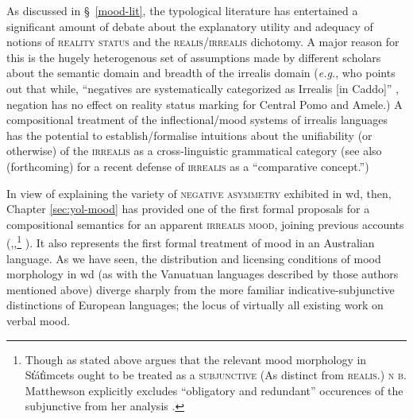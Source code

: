 %
%
%




As discussed in \S~\ref{mood-lit}, the typological literature has entertained a significant amount of debate about the explanatory utility and adequacy of notions of \textsc{reality status} and the \textsc{realis/irrealis} dichotomy. A major reason for this is the hugely heterogenous set of assumptions made by different scholars about the semantic domain and breadth of the irrealis domain (\textit{e.g.}, \citeauthor{Mithun1995} who points out that while, ``negatives are systematically categorized as Irrealis [in Caddo]'' \citeyearpar[380]{Mithun1995}, negation has no effect on reality status marking for Central Pomo and Amele.) A compositional treatment of the inflectional/mood systems of irrealis languages has the potential to establish/formalise intuitions about the unifiability (or otherwise) of the \textsc{irrealis} as a cross-linguistic grammatical category (see also \citeauthor{VonPrincea} (forthcoming) for a recent defense of \textsc{irrealis} as a ``comparative concept.'')

In view of explaining the variety of \textsc{negative asymmetry} exhibited in \gls{wd}, then, Chapter \ref{sec:yol-mood} has provided one of the first formal proposals for a compositional semantics for an apparent \textsc{irrealis mood}, joining previous accounts (\citealp[\textit{e.g.},][]{Krifka2016},\citealp{Matthewson2010},\footnote{Though as stated above \citet[13]{Matthewson2010} argues that the relevant mood morphology in  St̓át̓imcets ought to be treated as a \textsc{subjunctive} (As distinct from \textsc{realis}.) \textsc{n\kern -2pt b.} Matthewson explicitly excludes ``obligatory and redundant'' occurences of the subjunctive from her analysis \citeyearpar[26]{Matthewson2010}.} \citealp{VonPrince2018}). It also represents the first formal treatment of mood in an Australian language. As we have seen, the distribution and licensing conditions of mood morphology in \gls{wd} (as with the Vanuatuan languages described by those authors mentioned above) diverge sharply from the more familiar indicative-subjunctive distinctions of European languages; the locus of virtually all existing work on verbal mood. 


